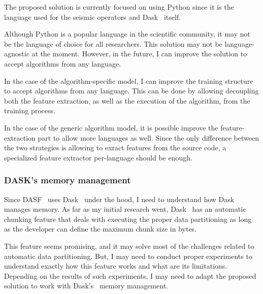 The proposed solution is currently focused on using Python since it is the language used for the seismic operators and Dask~\cite{dask} itself.

Although Python is a popular language in the scientific community, it may not be the language of choice for all researchers.
This solution may not be language-agnostic at the moment.
However, in the future, I can improve the solution to accept algorithms from any language.

In the case of the algorithm-specific model, I can improve the training structure to accept algorithms from any language.
This can be done by allowing decoupling both the feature extraction, as well as the execution of the algorithm, from the training process.

In the case of the generic algorithm model, it is possible improve the feature-extraction part to allow more languages as well.
Since the only difference between the two strategies is allowing to exract features from the source code, a specialized feature extractor per-language should be enough.

\subsubsection{DASK's memory management}

Since \ac{DASF}~\cite{dasf} uses Dask~\cite{dask} under the hood, I need to understand how Dask~\cite{dask} manages memory.
As far as my initial research went, Dask~\cite{dask} has an automatic chunking feature that deals with executing the proper data partitioning as long as the developer can define the maximum chunk size in bytes.

This feature seems promising, and it may solve most of the challenges related to automatic data partitioning.
But, I may need to conduct proper experiments to understand exactly how this feature works and what are its limitations.
Depending on the results of such experiments, I may need to adapt the proposed solution to work with Dask's~\cite{dask} memory management.
